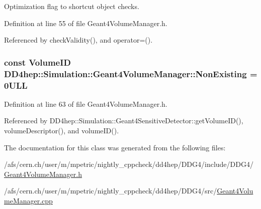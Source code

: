 Optimization flag to shortcut object checks. 

Definition at line 55 of file Geant4VolumeManager.h.

Referenced by checkValidity(), and operator=().\hypertarget{class_d_d4hep_1_1_simulation_1_1_geant4_volume_manager_a21aa25818681febe8658db66aa94b89c}{
\subsubsection[{NonExisting}]{\setlength{\rightskip}{0pt plus 5cm}const VolumeID {\bf DD4hep::Simulation::Geant4VolumeManager::NonExisting} = 0ULL}}
\label{class_d_d4hep_1_1_simulation_1_1_geant4_volume_manager_a21aa25818681febe8658db66aa94b89c}


Definition at line 63 of file Geant4VolumeManager.h.

Referenced by DD4hep::Simulation::Geant4SensitiveDetector::getVolumeID(), volumeDescriptor(), and volumeID().

The documentation for this class was generated from the following files:\begin{DoxyCompactItemize}
\item 
/afs/cern.ch/user/m/mpetric/nightly\_\-cppcheck/dd4hep/DDG4/include/DDG4/\hyperlink{_geant4_volume_manager_8h}{Geant4VolumeManager.h}\item 
/afs/cern.ch/user/m/mpetric/nightly\_\-cppcheck/dd4hep/DDG4/src/\hyperlink{_geant4_volume_manager_8cpp}{Geant4VolumeManager.cpp}\end{DoxyCompactItemize}
